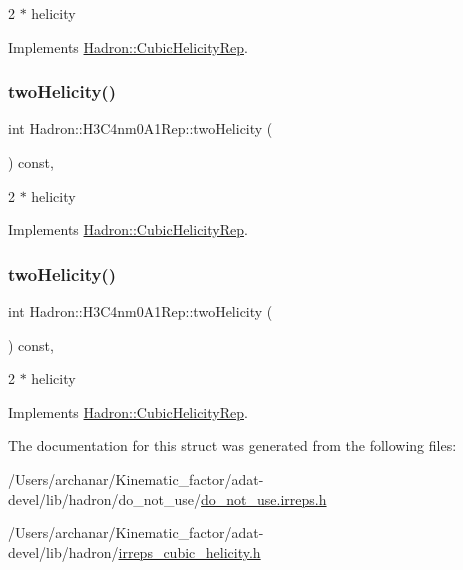 2 $\ast$ helicity 

Implements \mbox{\hyperlink{structHadron_1_1CubicHelicityRep_af507aa56fc2747eacc8cb6c96db31ecc}{Hadron\+::\+Cubic\+Helicity\+Rep}}.

\mbox{\label{structHadron_1_1H3C4nm0A1Rep_a98b5322646ba2129fe99f9b3c2a73b3f}} 
\subsubsection{\texorpdfstring{twoHelicity()}{twoHelicity()}\hspace{0.1cm}{\footnotesize\ttfamily [2/3]}}
{\footnotesize\ttfamily int Hadron\+::\+H3\+C4nm0\+A1\+Rep\+::two\+Helicity (\begin{DoxyParamCaption}{ }\end{DoxyParamCaption}) const\hspace{0.3cm}{\ttfamily [inline]}, {\ttfamily [virtual]}}

2 $\ast$ helicity 

Implements \mbox{\hyperlink{structHadron_1_1CubicHelicityRep_af507aa56fc2747eacc8cb6c96db31ecc}{Hadron\+::\+Cubic\+Helicity\+Rep}}.

\mbox{\label{structHadron_1_1H3C4nm0A1Rep_a98b5322646ba2129fe99f9b3c2a73b3f}} 
\subsubsection{\texorpdfstring{twoHelicity()}{twoHelicity()}\hspace{0.1cm}{\footnotesize\ttfamily [3/3]}}
{\footnotesize\ttfamily int Hadron\+::\+H3\+C4nm0\+A1\+Rep\+::two\+Helicity (\begin{DoxyParamCaption}{ }\end{DoxyParamCaption}) const\hspace{0.3cm}{\ttfamily [inline]}, {\ttfamily [virtual]}}

2 $\ast$ helicity 

Implements \mbox{\hyperlink{structHadron_1_1CubicHelicityRep_af507aa56fc2747eacc8cb6c96db31ecc}{Hadron\+::\+Cubic\+Helicity\+Rep}}.



The documentation for this struct was generated from the following files\+:\begin{DoxyCompactItemize}
\item 
/\+Users/archanar/\+Kinematic\+\_\+factor/adat-\/devel/lib/hadron/do\+\_\+not\+\_\+use/\mbox{\hyperlink{adat-devel_2lib_2hadron_2do__not__use_2do__not__use_8irreps_8h}{do\+\_\+not\+\_\+use.\+irreps.\+h}}\item 
/\+Users/archanar/\+Kinematic\+\_\+factor/adat-\/devel/lib/hadron/\mbox{\hyperlink{adat-devel_2lib_2hadron_2irreps__cubic__helicity_8h}{irreps\+\_\+cubic\+\_\+helicity.\+h}}\end{DoxyCompactItemize}
